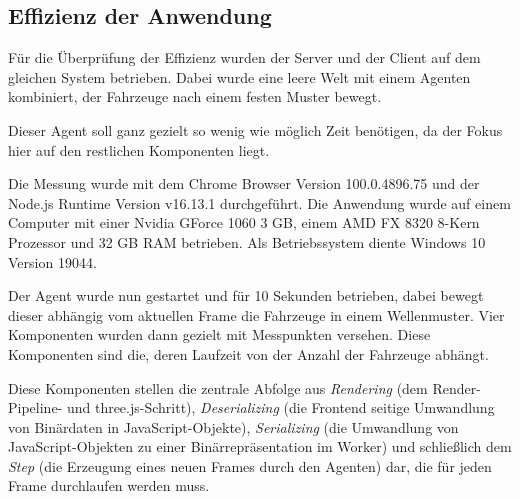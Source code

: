 \subsection{Effizienz der Anwendung} \label{sec:application_efficiency}

Für die Überprüfung der Effizienz wurden der Server und der Client auf dem gleichen System betrieben.
Dabei wurde eine leere Welt mit einem Agenten kombiniert, der Fahrzeuge nach einem festen Muster bewegt.

Dieser Agent soll ganz gezielt so wenig wie möglich Zeit benötigen, da der Fokus hier auf den restlichen Komponenten liegt.

Die Messung wurde mit dem Chrome Browser Version 100.0.4896.75 und der Node.js Runtime Version v16.13.1 durchgeführt.
Die Anwendung wurde auf einem Computer mit einer Nvidia GForce 1060 3 GB, einem AMD FX 8320 8-Kern Prozessor und 32 GB RAM betrieben.
Als Betriebssystem diente Windows 10 Version 19044.

Der Agent wurde nun gestartet und für 10 Sekunden betrieben, dabei bewegt dieser abhängig vom aktuellen Frame die Fahrzeuge in einem Wellenmuster.
Vier Komponenten wurden dann gezielt mit Messpunkten versehen.
Diese Komponenten sind die, deren Laufzeit von der Anzahl der Fahrzeuge abhängt.

Diese Komponenten stellen die zentrale Abfolge aus \textit{Rendering} (dem Render-Pipeline- und three.js-Schritt), \textit{Deserializing} (die Frontend seitige Umwandlung von Binärdaten in JavaScript-Objekte), \textit{Serializing} (die Umwandlung von JavaScript-Objekten zu einer Binärrepräsentation im Worker) und schließlich dem \textit{Step} (die Erzeugung eines neuen Frames durch den Agenten) dar, die für jeden Frame durchlaufen werden muss.

